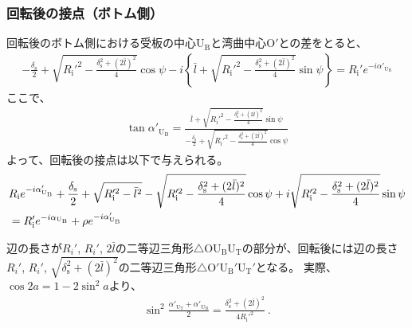 \subsubsection{回転後の接点（ボトム側）}
回転後のボトム側における受板の中心U$_\mathrm B$と湾曲中心O$'$との差をとると、
\begin{align*}
  -\frac{\delta_\mathrm s}2+\sqrt{R_\mathrm i'^2-\frac{\delta_\mathrm s^2+(2\bar l)^2}4}\cos\psi
  -i\left\{\bar l+\sqrt{R_\mathrm i'^2-\frac{\delta_\mathrm s^2+(2\bar l)^2}4}\sin\psi\right\}
  = R_\mathrm i'e^{-i\alpha'_{\mathrm U_\mathrm B}}
\end{align*}
ここで、
\begin{align*}
  \tan\alpha'_{\mathrm U_\mathrm B}
  = \frac{\displaystyle\bar l+\sqrt{R_\mathrm i'^2-\frac{\delta_\mathrm s^2+(2\bar l)^2}4}\sin\psi}
         {\displaystyle-\frac{\delta_\mathrm s}2+\sqrt{R_\mathrm i'^2-\frac{\delta_\mathrm s^2+(2\bar l)^2}4}\cos\psi}
\end{align*}
よって、回転後の接点は以下で与えられる。
\begin{align}
  \notag
  &  R_\mathrm ie^{-i\alpha'_{\mathrm U_\mathrm B}}
     +\frac{\delta_\mathrm s}2+\sqrt{R_\mathrm i'^2-\bar l^2}-\sqrt{R_\mathrm i'^2-\frac{\delta_\mathrm s^2+(2\bar l)^2}4}\cos\psi
     +i\sqrt{R_\mathrm i'^2-\frac{\delta_\mathrm s^2+(2\bar l)^2}4}\sin\psi\\
  &= R_\mathrm i'e^{-i\alpha_{\mathrm U_\mathrm B}}+\rho e^{-i\alpha'_{\mathrm U_\mathrm B}}
   \label{eq:afterUBcontact}
\end{align}
\begin{hosoku}
辺の長さが$R_i'$, $R_i'$, $2\bar l$の二等辺三角形$\triangle$OU$_\mathrm B$U$_\mathrm T$の部分が、回転後には辺の長さ$R_i'$, $R_i'$, $\sqrt{\delta_\mathrm s^2+(2\bar l)^2}$の二等辺三角形$\triangle$O$'$U$_\mathrm B'$U$_\mathrm T'$となる。
実際、$\cos2a = 1-2\sin^2\!a$より、
\begin{align*}
  \sin^2\frac{\alpha'_{\mathrm U_\mathrm T}+\alpha'_{\mathrm U_\mathrm B}}2
  = \frac{\delta_\mathrm s^2+(2\bar l)^2}{4R_\mathrm i'^2}\ .
\end{align*}
\end{hosoku}


